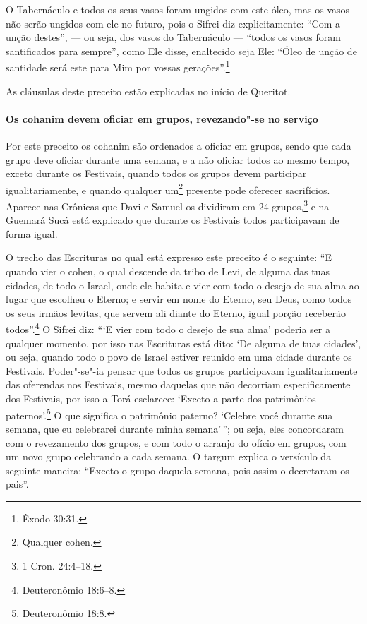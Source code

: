 \begin{multicols}{2}
O Tabernáculo e todos os seus vasos foram ungidos com este óleo,
mas os vasos não serão ungidos com ele no futuro, pois o Sifrei\starr{} diz
explicitamente: ``Com a unção destes'', --- ou seja, dos vasos do
Tabernáculo --- ``todos os vasos foram santificados para sempre'', como
Ele disse, enaltecido seja Ele: ``Óleo de unção de santidade será este
para Mim por vossas gerações''.\footnote{Êxodo 30:31.}

As cláusulas deste preceito estão explicadas no início de Queritot\starr.

\paragraph{Os cohanim\starr{} devem oficiar em grupos, revezando"-se no serviço}

Por este preceito os cohanim\starr{} são ordenados a oficiar em grupos,
sendo que cada grupo deve oficiar durante uma semana, e a não oficiar
todos ao mesmo tempo, exceto durante os Festivais, quando todos os grupos
devem participar igualitariamente, e quando qualquer
um\footnote{Qualquer cohen\starr.} presente pode oferecer sacrifícios. Aparece nas Crônicas que Davi e Samuel os dividiram em 24 grupos,\footnote{1 Cron. 24:4--18.}
e na Guemará\starr{} Sucá\starr{} está explicado que durante os Festivais todos
participavam de forma igual.

O trecho das Escrituras no qual está expresso este preceito é o
seguinte: ``E quando vier o cohen\starr, o qual descende da tribo de Levi\starr,
de alguma das tuas cidades, de todo o Israel, onde ele habita e vier com
todo o desejo de sua alma ao lugar que escolheu o Eterno; e servir em
nome do Eterno, seu Deus, como todos os seus irmãos levitas\starr, que servem
ali diante do Eterno, igual porção receberão todos''.\footnote{Deuteronômio
18:6--8.} O Sifrei\starr{} diz: ```E vier com todo o desejo de sua alma' poderia ser a qualquer momento, por isso nas
Escrituras está dito: `De alguma de tuas cidades', ou seja, quando todo
o povo de Israel estiver reunido em uma cidade durante os Festivais.
Poder"-se"-ia pensar que todos os grupos participavam igualitariamente das
oferendas nos Festivais, mesmo daquelas que não decorriam
especificamente dos Festivais, por isso a Torá\starr{} esclarece: `Exceto a
parte dos patrimônios paternos'.\footnote{Deuteronômio 18:8.} O que significa o
patrimônio paterno? `Celebre você durante sua semana, que eu celebrarei
durante minha semana'\,''; ou seja, eles concordaram com o revezamento
dos grupos, e com todo o arranjo do ofício em grupos, com um novo grupo
celebrando a cada semana. O targum\starr{} explica o versículo da seguinte
maneira: ``Exceto o grupo daquela semana, pois assim o decretaram os
pais''.


\end{multicols}
